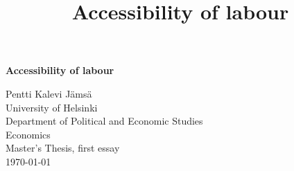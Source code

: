 \documentclass[a4paper, 12 pt]{article}   	%
\title{Accessibility of labour}
\begin{document}
\begin{titlepage} %
\begin{center}	
	\vspace*{\fill}
   	
	{\Huge\bfseries Accessibility of labour}
	\end{center}
	
	\vfill
	\raggedleft
	{\Large Pentti Kalevi Jämsä}\\
	\vspace{1.5mm}
	\raggedleft
	{\Large University of Helsinki}\\
	\vspace{1.5mm}
	{\Large Department of Political and Economic Studies}\\
	\vspace{1.5mm}
	{\Large Economics}\\
	\vspace{1.5mm}
	{\Large Master's Thesis, first essay}\\
\vspace{1.5mm}
	{\Large \today}
	
\end{titlepage}

\tableofcontents
\newpage





\nocite{geurs, melo, laakso, venables2007, venables2017, andersson, mackie, marshall, pilegaard, small, liikenne, goebel, brueckner, alonso, mills, muth, mcmillen, fujita, hsl, rosenthal, evers, van, guti}




\end{document}
